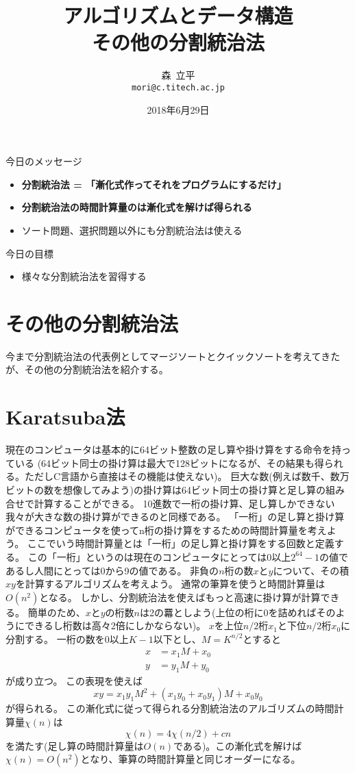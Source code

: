 \documentclass[a4paper,twoside,onecolumn,openany,article,10pt]{memoir}
\title{アルゴリズムとデータ構造\\\vspace{.5em} \Large その他の分割統治法}
\date{2018年6月29日}
\author{森~立平\\ \texttt{mori@c.titech.ac.jp}}
\theoremstyle{definition}
\theoremstyle{remark}
\begin{document}
\maketitle


\noindent
今日のメッセージ
\begin{itemize}
\item \textbf{分割統治法 = 「漸化式作ってそれをプログラムにするだけ」}
\item \textbf{分割統治法の時間計算量のは漸化式を解けば得られる}
\item ソート問題、選択問題以外にも分割統治法は使える
\end{itemize}

\noindent
今日の目標
\begin{itemize}
\item 様々な分割統治法を習得する
\end{itemize}




\section{その他の分割統治法}
今まで分割統治法の代表例としてマージソートとクイックソートを考えてきたが、その他の分割統治法を紹介する。


\section{Karatsuba法}
現在のコンピュータは基本的に64ビット整数の足し算や掛け算をする命令を持っている
(64ビット同士の掛け算は最大で128ビットになるが、その結果も得られる。ただしC言語から直接はその機能は使えない)。
巨大な数(例えば数千、数万ビットの数を想像してみよう)の掛け算は64ビット同士の掛け算と足し算の組み合せで計算することができる。
10進数で一桁の掛け算、足し算しかできない我々が大きな数の掛け算ができるのと同様である。
「一桁」の足し算と掛け算ができるコンピュータを使ってn桁の掛け算をするための時間計算量を考えよう。
ここでいう時間計算量とは「一桁」の足し算と掛け算をする回数と定義する。
この「一桁」というのは現在のコンピュータにとっては0以上$2^{64}-1$の値であるし人間にとっては0から9の値である。
非負の$n$桁の数$x$と$y$について、その積$xy$を計算するアルゴリズムを考えよう。
通常の筆算を使うと時間計算量は$O(n^2)$となる。
しかし、分割統治法を使えばもっと高速に掛け算が計算できる。
簡単のため、$x$と$y$の桁数$n$は2の羃としよう(上位の桁に0を詰めればそのようにできるし桁数は高々2倍にしかならない)。
$x$を上位$n/2$桁$x_1$と下位$n/2$桁$x_0$に分割する。
一桁の数を0以上$K-1$以下とし、$M=K^{n/2}$とすると
\begin{align*}
x &= x_1 M + x_0\\
y &= y_1 M + y_0
\end{align*}
が成り立つ。
この表現を使えば
\begin{equation*}
xy = x_1y_1 M^2 + (x_1 y_0 + x_0 y_1) M + x_0 y_0
\end{equation*}
が得られる。
この漸化式に従って得られる分割統治法のアルゴリズムの時間計算量$\chi(n)$は
\begin{equation*}
\chi(n) = 4\chi(n/2) + cn
\end{equation*}
を満たす(足し算の時間計算量は$O(n)$である)。この漸化式を解けば$\chi(n)=O(n^2)$となり、筆算の時間計算量と同じオーダーになる。
\end{document}
